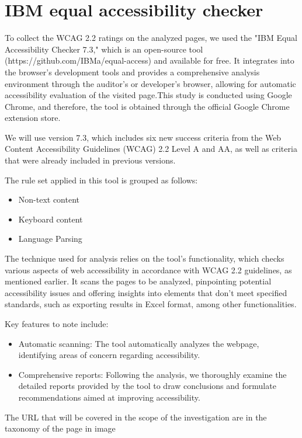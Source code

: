\documentclass{article}
\begin{document}
\section{IBM equal accessibility checker}
To collect the WCAG 2.2 ratings on the analyzed pages, we used the "IBM Equal Accessibility Checker 7.3," which is an open-source tool (https://github.com/IBMa/equal-access) and available for free. It integrates into the browser's development tools and provides a comprehensive analysis environment through the auditor's or developer's browser, allowing for automatic accessibility evaluation of the visited page.This study is conducted using Google Chrome, and therefore, the tool is obtained through the official Google Chrome extension store.

We will use version 7.3, which includes six new success criteria from the Web Content Accessibility Guidelines (WCAG) 2.2 Level A and AA, as well as criteria that were already included in previous versions.

The rule set applied in this tool is grouped as follows:

\begin{itemize}
    \item Non-text content
    \item Keyboard content
    \item Language Parsing
\end{itemize}

The technique used for analysis relies on the tool's functionality, which checks various aspects of web accessibility in accordance with WCAG 2.2 guidelines, as mentioned earlier. It scans the pages to be analyzed, pinpointing potential accessibility issues and offering insights into elements that don't meet specified standards, such as exporting results in Excel format, among other functionalities.

Key features to note include:

\begin{itemize}
    \item Automatic scanning: The tool automatically analyzes the webpage, identifying areas of concern regarding accessibility.
    \item Comprehensive reports: Following the analysis, we thoroughly examine the detailed reports provided by the tool to draw conclusions and formulate recommendations aimed at improving accessibility.
\end{itemize}

The URL that will be covered in the scope of the investigation are in the taxonomy of the page in image
\end{document}
